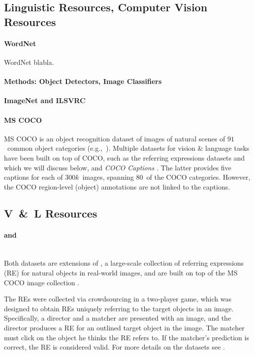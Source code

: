 \subsection{Linguistic Resources, Computer Vision Resources}
\paragraph{WordNet}
WordNet \cite{fellbaum1998wordnet} blabla. 

\paragraph{Methods: Object Detectors, Image Classifiers} 

\paragraph{ImageNet and ILSVRC}


\paragraph{MS COCO} \cite{mscoco}
MS COCO is an object recognition dataset of images of natural scenes of $91$~common object categories (e.g.,~). 
Multiple datasets for vision \& language tasks have been built on top of COCO, such as the referring expressions datasets  and  which we will discuss below, and \textsl{COCO Captions} \cite{chen2015cococaptions}.  
The latter provides five captions for each of  $300k$~images, spanning $80$~of the COCO categories.  
However, the COCO region-level (object) annotations are not linked to the captions.
\subsection{V\ \&\ L Resources}

\paragraph{ and  \cite{Yu2016}}~\\ 
Both datasets are extensions of \cite{Kazemzadeh2014}, a large-scale collection of referring expressions (RE) for natural objects in real-world images, and are built on top of the MS COCO image collection \cite{mscoco}. 

The REs were collected via crowdsourcing in a two-player game, which was designed to obtain REs uniquely referring to the target objects in an image. 
Specifically, a director and a matcher are presented with an image, and the director produces a RE for an outlined target object in the image. 
The matcher must click on the object he thinks the RE refers to. 
If the matcher's prediction is correct, the RE is considered valid. 
For more details on the datasets see \cite{Yu2016}.

